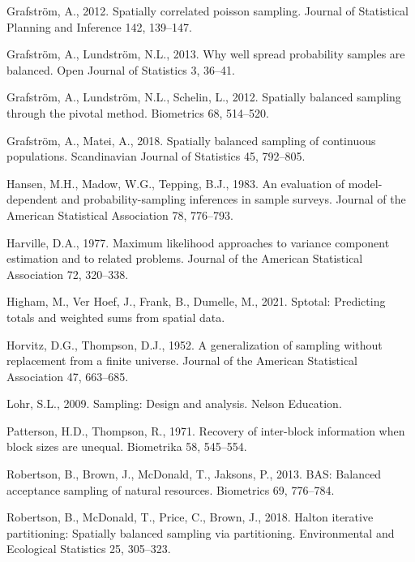 \documentclass[]{elsarticle} %
\begin{document}
\leavevmode\hypertarget{ref-grafstrom2012spatiallypoisson}{}%
Grafström, A., 2012. Spatially correlated poisson sampling. Journal of
Statistical Planning and Inference 142, 139--147.

\leavevmode\hypertarget{ref-grafstrom2013well}{}%
Grafström, A., Lundström, N.L., 2013. Why well spread probability
samples are balanced. Open Journal of Statistics 3, 36--41.

\leavevmode\hypertarget{ref-grafstrom2012spatially}{}%
Grafström, A., Lundström, N.L., Schelin, L., 2012. Spatially balanced
sampling through the pivotal method. Biometrics 68, 514--520.

\leavevmode\hypertarget{ref-grafstrom2018spatially}{}%
Grafström, A., Matei, A., 2018. Spatially balanced sampling of
continuous populations. Scandinavian Journal of Statistics 45, 792--805.

\leavevmode\hypertarget{ref-hansen1983evaluation}{}%
Hansen, M.H., Madow, W.G., Tepping, B.J., 1983. An evaluation of
model-dependent and probability-sampling inferences in sample surveys.
Journal of the American Statistical Association 78, 776--793.

\leavevmode\hypertarget{ref-harville1977maximum}{}%
Harville, D.A., 1977. Maximum likelihood approaches to variance
component estimation and to related problems. Journal of the American
Statistical Association 72, 320--338.

\leavevmode\hypertarget{ref-higham2021sptotal}{}%
Higham, M., Ver Hoef, J., Frank, B., Dumelle, M., 2021. Sptotal:
Predicting totals and weighted sums from spatial data.

\leavevmode\hypertarget{ref-horvitz1952generalization}{}%
Horvitz, D.G., Thompson, D.J., 1952. A generalization of sampling
without replacement from a finite universe. Journal of the American
Statistical Association 47, 663--685.

\leavevmode\hypertarget{ref-lohr2009sampling}{}%
Lohr, S.L., 2009. Sampling: Design and analysis. Nelson Education.

\leavevmode\hypertarget{ref-patterson1971recovery}{}%
Patterson, H.D., Thompson, R., 1971. Recovery of inter-block information
when block sizes are unequal. Biometrika 58, 545--554.

\leavevmode\hypertarget{ref-robertson2013bas}{}%
Robertson, B., Brown, J., McDonald, T., Jaksons, P., 2013. BAS: Balanced
acceptance sampling of natural resources. Biometrics 69, 776--784.

\leavevmode\hypertarget{ref-robertson2018halton}{}%
Robertson, B., McDonald, T., Price, C., Brown, J., 2018. Halton
iterative partitioning: Spatially balanced sampling via partitioning.
Environmental and Ecological Statistics 25, 305--323.
\end{document}
